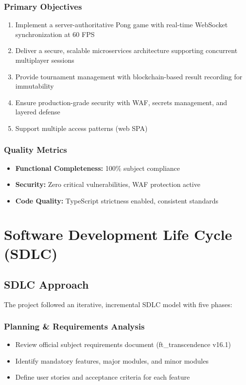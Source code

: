\documentclass[11pt,a4paper]{report}
\begin{document}
\subsection{Primary Objectives}
\begin{enumerate}
  \item Implement a server-authoritative Pong game with real-time WebSocket synchronization at 60 FPS
  \item Deliver a secure, scalable microservices architecture supporting concurrent multiplayer sessions
  \item Provide tournament management with blockchain-based result recording for immutability
  \item Ensure production-grade security with WAF, secrets management, and layered defense
  \item Support multiple access patterns (web SPA)
\end{enumerate}

\subsection{Quality Metrics}
\begin{itemize}
  \item \textbf{Functional Completeness:} 100\% subject compliance
  \item \textbf{Security:} Zero critical vulnerabilities, WAF protection active
  \item \textbf{Code Quality:} TypeScript strictness enabled, consistent standards
\end{itemize}

\chapter{Software Development Life Cycle (SDLC)}
\label{ch:sdlc}

\section{SDLC Approach}
\label{sec:sdlc_approach}

The project followed an iterative, incremental SDLC model with five phases:

\subsection{Planning \& Requirements Analysis}
\begin{itemize}
  \item Review official subject requirements document (ft\_transcendence v16.1)
  \item Identify mandatory features, major modules, and minor modules
  \item Define user stories and acceptance criteria for each feature
\end{itemize}
\end{document}
